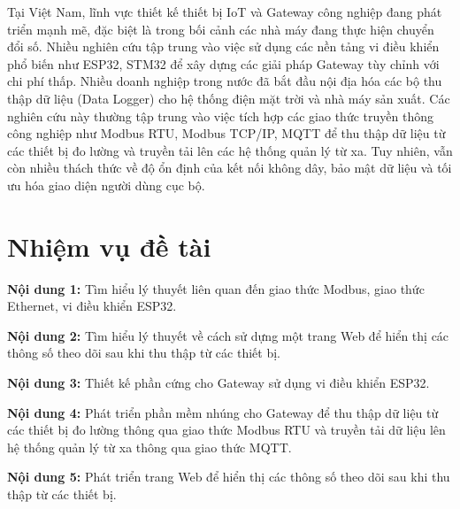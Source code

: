 Tại Việt Nam, lĩnh vực thiết kế thiết bị IoT và Gateway công nghiệp đang phát triển mạnh mẽ, đặc biệt là trong bối cảnh các nhà máy đang thực hiện chuyển đổi số. 
Nhiều nghiên cứu tập trung vào việc sử dụng các nền tảng vi điều khiển phổ biến như ESP32, STM32 để xây dựng các giải pháp Gateway tùy chỉnh với chi phí thấp.
Nhiều doanh nghiệp trong nước đã bắt đầu nội địa hóa các bộ thu thập dữ liệu (Data Logger) cho hệ thống điện mặt trời và nhà máy sản xuất.
Các nghiên cứu này thường tập trung vào việc tích hợp các giao thức truyền thông công nghiệp như Modbus RTU, Modbus TCP/IP, MQTT để thu thập dữ liệu từ các thiết 
bị đo lường và truyền tải lên các hệ thống quản lý từ xa. Tuy nhiên, vẫn còn nhiều thách thức về độ ổn định của kết nối không dây, bảo mật dữ liệu và tối ưu hóa 
giao diện người dùng cục bộ.\\
\section{Nhiệm vụ đề tài}
\textbf{Nội dung 1:} Tìm hiểu lý thuyết liên quan đến giao thức Modbus, giao thức Ethernet, vi điều khiển ESP32.

\textbf{Nội dung 2:} Tìm hiểu lý thuyết về cách sử dựng một trang Web để hiển thị các thông số theo dõi sau khi thu thập từ các thiết bị.

\textbf{Nội dung 3:} Thiết kế phần cứng cho Gateway sử dụng vi điều khiển ESP32.

\textbf{Nội dung 4:} Phát triển phần mềm nhúng cho Gateway để thu thập dữ liệu từ các thiết bị đo lường thông qua giao thức Modbus RTU và truyền tải dữ liệu lên hệ thống quản lý từ xa thông qua giao thức MQTT.

\textbf{Nội dung 5:} Phát triển trang Web để hiển thị các thông số theo dõi sau khi thu thập từ các thiết bị.
